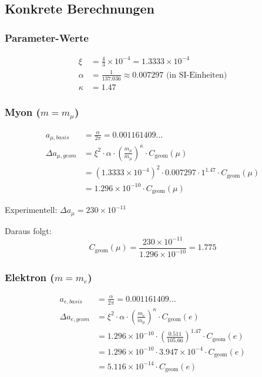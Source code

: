 \documentclass[12pt,a4paper]{article}
\numberwithin{equation}{section}
\newcommand{\xipar}{\xi}
\newcommand{\Cgeom}{C_{\text{geom}}}
\newcommand{\kappaT}{\kappa}
\newcommand{\mmu}{m_{\mu}}
\newcommand{\melec}{m_{e}}
\begin{document}
	\subsection{Konkrete Berechnungen}
	
	\subsubsection{Parameter-Werte}
	
	\begin{align}
		\xipar &= \frac{4}{3} \times 10^{-4} = 1.3333 \times 10^{-4}\\
		\alpha &= \frac{1}{137.036} \approx 0.007297 \text{ (in SI-Einheiten)}\\
		\kappaT &= 1.47
	\end{align}
	
	\subsubsection{Myon ($m = \mmu$)}
	
	\begin{align}
		a_{\mu,basis} &= \frac{\alpha}{2\pi} = 0.001161409\ldots\\
		\Delta a_{\mu,geom} &= \xipar^2 \cdot \alpha \cdot \left(\frac{\mmu}{\mmu}\right)^\kappaT \cdot \Cgeom(\mu)\\
		&= (1.3333 \times 10^{-4})^2 \cdot 0.007297 \cdot 1^{1.47} \cdot \Cgeom(\mu)\\
		&= 1.296 \times 10^{-10} \cdot \Cgeom(\mu)
	\end{align}
	
	Experimentell: $\Delta a_\mu = 230 \times 10^{-11}$
	
	Daraus folgt:
	\begin{equation}
		\Cgeom(\mu) = \frac{230 \times 10^{-11}}{1.296 \times 10^{-10}} = 1.775
	\end{equation}
	
	\subsubsection{Elektron ($m = \melec$)}
	
	\begin{align}
		a_{e,basis} &= \frac{\alpha}{2\pi} = 0.001161409\ldots\\
		\Delta a_{e,geom} &= \xipar^2 \cdot \alpha \cdot \left(\frac{\melec}{\mmu}\right)^\kappaT \cdot \Cgeom(e)\\
		&= 1.296 \times 10^{-10} \cdot \left(\frac{0.511}{105.66}\right)^{1.47} \cdot \Cgeom(e)\\
		&= 1.296 \times 10^{-10} \cdot 3.947 \times 10^{-4} \cdot \Cgeom(e)\\
		&= 5.116 \times 10^{-14} \cdot \Cgeom(e)
	\end{align}
	
\end{document}
